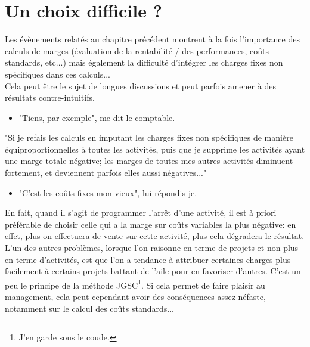 
\chapter{Un choix difficile ?}


Les évènements relatés au chapitre précédent montrent à 
la fois l'importance des calculs de marges (évaluation 
de la rentabilité / des performances, coûts standards, etc...\/)
mais également la difficulté d'intégrer les charges fixes non 
spécifiques dans ces calculs... \\
\hspace*{\parindent}Cela peut être le sujet de longues discussions et peut parfois 
amener à des résultats contre-intuitifs.
\begin{itemize}
 \item "Tiens, par exemple", me dit le comptable.
\end{itemize} 
"Si je refais les calculs en imputant les charges fixes non 
spécifiques de manière équiproportionnelles à toutes les activités, 
puis que je supprime les activités ayant une marge totale 
négative; les marges de toutes mes autres 
activités diminuent fortement, et deviennent parfois elles aussi négatives..."
\begin{itemize}
 \item "C'est les coûts fixes mon vieux", lui répondis-je.
\end{itemize} 
En fait, quand il s'agit de programmer l'arrêt d'une activité, il est 
à priori préférable de choisir celle qui a la marge sur coûts variables 
la plus négative: en effet, plus on effectuera de vente sur cette activité, 
plus cela dégradera le résultat. \\
\hspace*{\parindent}L'un des autres problèmes, lorsque l'on raisonne en terme de projets et 
non plus en terme d'activités, est que l'on a tendance à attribuer certaines 
charges plus facilement à certains projets battant de l'aile pour 
en favoriser d'autres. 
C'est un peu le principe de la méthode JGSC\footnote{J'en garde sous le coude.}.
Si cela permet de faire plaisir au management, cela peut cependant avoir 
des conséquences assez néfaste, notamment sur le calcul des coûts standards...

